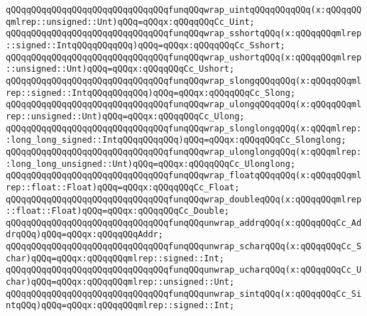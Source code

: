 \verb|qQQqqQQqqQQqqQQqqQQqqQQqqQQqqQQqfunqQQqwrap_uintqQQqqQQqqQQq(x:qQQqqQQqmlrep::unsigned::Unt)qQQq=qQQqx:qQQqqQQqCc_Uint;|\newline
\newline
\verb|qQQqqQQqqQQqqQQqqQQqqQQqqQQqqQQqfunqQQqwrap_sshortqQQq(x:qQQqqQQqmlrep::signed::IntqQQqqQQqqQQq)qQQq=qQQqx:qQQqqQQqCc_Sshort;|\newline
\verb|qQQqqQQqqQQqqQQqqQQqqQQqqQQqqQQqfunqQQqwrap_ushortqQQq(x:qQQqqQQqmlrep::unsigned::Unt)qQQq=qQQqx:qQQqqQQqCc_Ushort;|\newline
\newline
\verb|qQQqqQQqqQQqqQQqqQQqqQQqqQQqqQQqfunqQQqwrap_slongqQQqqQQq(x:qQQqqQQqmlrep::signed::IntqQQqqQQqqQQq)qQQq=qQQqx:qQQqqQQqCc_Slong;|\newline
\verb|qQQqqQQqqQQqqQQqqQQqqQQqqQQqqQQqfunqQQqwrap_ulongqQQqqQQq(x:qQQqqQQqmlrep::unsigned::Unt)qQQq=qQQqx:qQQqqQQqCc_Ulong;|\newline
\newline
\verb|qQQqqQQqqQQqqQQqqQQqqQQqqQQqqQQqfunqQQqwrap_slonglongqQQq(x:qQQqmlrep::long_long_signed::IntqQQqqQQqqQQq)qQQq=qQQqx:qQQqqQQqCc_Slonglong;|\newline
\verb|qQQqqQQqqQQqqQQqqQQqqQQqqQQqqQQqfunqQQqwrap_ulonglongqQQq(x:qQQqmlrep::long_long_unsigned::Unt)qQQq=qQQqx:qQQqqQQqCc_Ulonglong;|\newline
\newline
\verb|qQQqqQQqqQQqqQQqqQQqqQQqqQQqqQQqfunqQQqwrap_floatqQQqqQQq(x:qQQqqQQqmlrep::float::Float)qQQq=qQQqx:qQQqqQQqCc_Float;|\newline
\verb|qQQqqQQqqQQqqQQqqQQqqQQqqQQqqQQqfunqQQqwrap_doubleqQQq(x:qQQqqQQqmlrep::float::Float)qQQq=qQQqx:qQQqqQQqCc_Double;|\newline
\newline
\verb|qQQqqQQqqQQqqQQqqQQqqQQqqQQqqQQqfunqQQqunwrap_addrqQQq(x:qQQqqQQqCc_AddrqQQq)qQQq=qQQqx:qQQqqQQqAddr;|\newline
\newline
\verb|qQQqqQQqqQQqqQQqqQQqqQQqqQQqqQQqfunqQQqunwrap_scharqQQq(x:qQQqqQQqCc_Schar)qQQq=qQQqx:qQQqqQQqmlrep::signed::Int;|\newline
\verb|qQQqqQQqqQQqqQQqqQQqqQQqqQQqqQQqfunqQQqunwrap_ucharqQQq(x:qQQqqQQqCc_Uchar)qQQq=qQQqx:qQQqqQQqmlrep::unsigned::Unt;|\newline
\newline
\verb|qQQqqQQqqQQqqQQqqQQqqQQqqQQqqQQqfunqQQqunwrap_sintqQQq(x:qQQqqQQqCc_SintqQQq)qQQq=qQQqx:qQQqqQQqmlrep::signed::Int;|\newline
